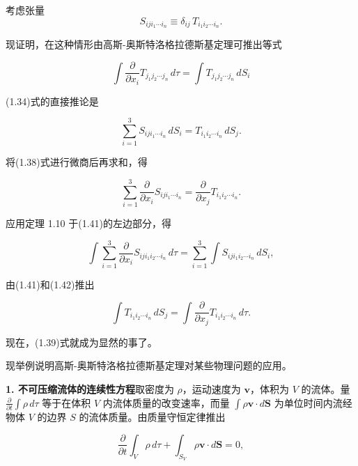 \documentclass[11pt,a4paper,oneside]{ctexbook}
\newcommand{\ve}[1]{\bm{#1}}
\begin{document}
考虑张量
\begin{equation}
S_{iji_1 \cdots i_n} \equiv \delta_{ij}\, T_{i_1 i_2 \cdots i_n}.
\tag{1.38}
\end{equation}

现证明，在这种情形由高斯-奥斯特洛格拉德斯基定理可推出等式

\begin{equation}
\int \frac{\partial}{\partial x_i} T_{j_1 j_2 \cdots j_n}\, d\tau = \int T_{j_1 j_2 \cdots j_n}\, dS_i
\tag{1.39}
\end{equation}

(1.34)式的直接推论是

\begin{equation}
\sum_{i=1}^{3} S_{iji_1 \cdots i_n}\, dS_i = T_{i_1 i_2 \cdots i_n}\, dS_j.
\tag{1.40}
\end{equation}

将(1.38)式进行微商后再求和，得

\begin{equation}
\sum_{i=1}^{3} \frac{\partial}{\partial x_i} S_{iji_1 \cdots i_n} = \frac{\partial}{\partial x_j} T_{i_1 i_2 \cdots i_n}.
\tag{1.41}
\end{equation}

应用定理 1.10 于(1.41)的左边部分，得

\begin{equation}
\int \sum_{i=1}^{3} \frac{\partial}{\partial x_i} S_{iji_1 i_2 \cdots i_n}\, d\tau = \sum_{i=1}^{3} \int S_{iji_1 i_2 \cdots i_n}\, dS_i,
\tag{1.42}
\end{equation}

由(1.41)和(1.42)推出

\begin{equation*}
\int T_{i_1 i_2 \cdots i_n}\, dS_j = \int \frac{\partial}{\partial x_j} T_{i_1 i_2 \cdots i_n}\, d\tau.
\end{equation*}

现在，(1.39)式就成为显然的事了。

现举例说明高斯-奥斯特洛格拉德斯基定理对某些物理问题的应用。

\textbf{1. 不可压缩流体的连续性方程}\quad 取密度为 $\rho$，运动速度为 $\ve{v}$，体积为 $V$ 的流体。量 $\frac{\partial}{\partial t} \int \rho\, d\tau$ 等于在体积 $V$ 内流体质量的改变速率，而量 $\int \rho\ve{v} \cdot d\ve{S}$ 为单位时间内流经物体 $V$ 的边界 $S$ 的流体质量。由质量守恒定律推出

\begin{equation*}
\frac{\partial}{\partial t} \int_{V} \rho\, d\tau + \int_{S_V} \rho\ve{v} \cdot d\ve{S} = 0,
\end{equation*}
\end{document}
